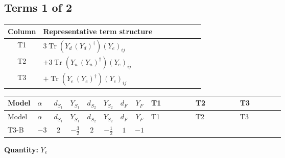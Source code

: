 \documentclass[8pt]{article}
\begin{document}
\begin{landscape}
\subsection*{Terms 1 of 2}
\begin{center}
\begin{tabular}{@{}c >{\raggedright\arraybackslash}p{0.82\linewidth}@{}}
\toprule
Column & Representative term structure \\
\midrule
T1 & \(\displaystyle 3 \operatorname{Tr}\!\left({Y_d}\,\left({Y_d}\right)^{\dagger}\right) \left({Y_e}\right)_{ij}\) \\
\midrule
T2 & \(\displaystyle +3 \operatorname{Tr}\!\left({Y_u}\,\left({Y_u}\right)^{\dagger}\right) \left({Y_e}\right)_{ij}\) \\
\midrule
T3 & \(\displaystyle +\operatorname{Tr}\!\left({Y_e}\,\left({Y_e}\right)^{\dagger}\right) \left({Y_e}\right)_{ij}\) \\
\midrule
\bottomrule
\end{tabular}
\end{center}
\smallskip
\tiny
\begin{longtable}{@{}llcccccc >{\raggedright\arraybackslash}p{0.21\linewidth} >{\raggedright\arraybackslash}p{0.21\linewidth} >{\raggedright\arraybackslash}p{0.21\linewidth}@{}}
\toprule
Model & $\alpha$ & $d_{S_1}$ & $Y_{S_1}$ & $d_{S_2}$ & $Y_{S_2}$ & $d_F$ & $Y_F$ & T1 & T2 & T3 \\
\midrule
\endfirsthead
\toprule
Model & $\alpha$ & $d_{S_1}$ & $Y_{S_1}$ & $d_{S_2}$ & $Y_{S_2}$ & $d_F$ & $Y_F$ & T1 & T2 & T3 \\
\midrule
\endhead
T3-B & $-3$ & $2$ & $-\frac{3}{2}$ & $2$ & $-\frac{1}{2}$ & $1$ & $-1$ & \scriptsize\adjustbox{max width=\linewidth}{$\begin{gathered} 3 \operatorname{Tr}\!\left({Y_d}\,\left({Y_d}\right)^{\dagger}\right) \left({Y_e}\right)_{ij}\end{gathered}$} & \scriptsize\adjustbox{max width=\linewidth}{$\begin{gathered} +3 \operatorname{Tr}\!\left({Y_u}\,\left({Y_u}\right)^{\dagger}\right) \left({Y_e}\right)_{ij}\end{gathered}$} & \scriptsize\adjustbox{max width=\linewidth}{$\begin{gathered} +\operatorname{Tr}\!\left({Y_e}\,\left({Y_e}\right)^{\dagger}\right) \left({Y_e}\right)_{ij}\end{gathered}$} \\
\midrule
\bottomrule
\end{longtable}
\clearpage
\noindent\textbf{Quantity: }$Y_e$\par\smallskip

\end{landscape}
\end{document}
